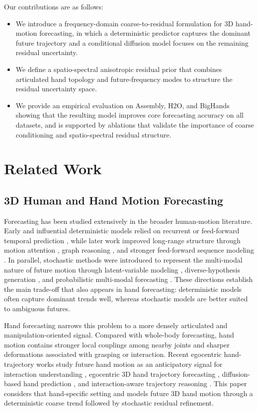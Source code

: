 \documentclass[runningheads]{llncs}
\begin{document}
Our contributions are as follows:
\begin{itemize}
    \item We introduce a frequency-domain coarse-to-residual formulation for 3D hand-motion forecasting, in which a deterministic predictor captures the dominant future trajectory and a conditional diffusion model focuses on the remaining residual uncertainty.
    \item We define a spatio-spectral anisotropic residual prior that combines articulated hand topology and future-frequency modes to structure the residual uncertainty space.
    \item We provide an empirical evaluation on Assembly, H2O, and BigHands showing that the resulting model improves core forecasting accuracy on all datasets, and is supported by ablations that validate the importance of coarse conditioning and spatio-spectral residual structure.
\end{itemize}

\section{Related Work}

\subsection{3D Human and Hand Motion Forecasting}

Forecasting has been studied extensively in the broader human-motion literature. Early and influential deterministic models relied on recurrent or feed-forward temporal prediction \cite{Martinez2017RNN}, while later work improved long-range structure through motion attention \cite{Mao2020HistoryRepeats}, graph reasoning \cite{Dang2021MSRGCN}, and stronger feed-forward sequence modeling \cite{Guo2023SiMLPe}. In parallel, stochastic methods were introduced to represent the multi-modal nature of future motion through latent-variable modeling \cite{Yuan2020DLow,aliakbarian2020stochastic}, diverse-hypothesis generation \cite{mao2021gsps,Ma2022MultiObjective}, and probabilistic multi-modal forecasting \cite{Salzmann2022Motron}. These directions establish the main trade-off that also appears in hand forecasting: deterministic models often capture dominant trends well, whereas stochastic models are better suited to ambiguous futures.

Hand forecasting narrows this problem to a more densely articulated and manipulation-oriented signal. Compared with whole-body forecasting, hand motion contains stronger local couplings among nearby joints and sharper deformations associated with grasping or interaction. Recent egocentric hand-trajectory works study future hand motion as an anticipatory signal for interaction understanding \cite{Liu2022Hotspots}, egocentric 3D hand trajectory forecasting \cite{Bao2023USST,Hatano2025EgoH4}, diffusion-based hand prediction \cite{Tang2024PromptFDDM}, and interaction-aware trajectory reasoning \cite{Chen2025EgoMAN}. This paper considers that hand-specific setting and models future 3D hand motion through a deterministic coarse trend followed by stochastic residual refinement.
\end{document}
